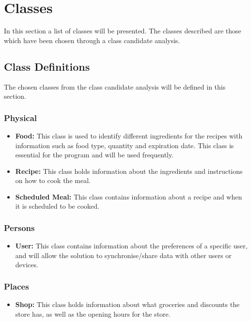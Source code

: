 \section{Classes}\label{ClassesLabel}
In this section a list of classes will be presented. The classes described are those which have been chosen through a class candidate analysis.

\subsection{Class Definitions}
The chosen classes from the class candidate analysis will be defined in this section.
\subsubsection{Physical}
\begin{itemize}
\item \textbf{Food:} This class is used to identify different ingredients for the recipes with information such as food type, quantity and expiration date. This class is essential for the program and will be used frequently.
\item \textbf{Recipe:} This class holds information about the ingredients and instructions on how to cook the meal.
\item \textbf{Scheduled Meal:} This class contains information about a recipe and when it is scheduled to be cooked.
\end{itemize}

\subsubsection{Persons}
\begin{itemize}
\item \textbf{User:} This class contains information about the preferences of a specific user, and will allow the solution to synchronise/share data with other users or devices.
\end{itemize}

\subsubsection{Places}
\begin{itemize}
\item \textbf{Shop:} This class holds information about what groceries and discounts the store has, as well as the opening hours for the store.
\end{itemize}

